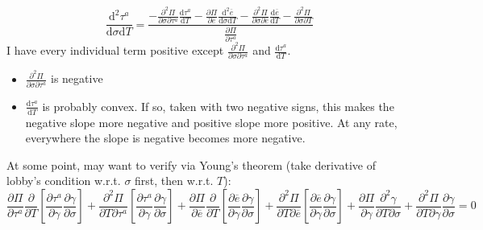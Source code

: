 \documentclass[12pt]{article}
\newcommand{\ov}{\overline}
\newcommand{\ga}{\gamma}
\begin{document}
\[
  \frac{\mathrm{d}^2 \tau^a}{\mathrm{d} \sigma \mathrm{d} T} = \frac{- \frac{\partial^2 \Pi}{\partial \sigma \partial \tau^a}\frac{\mathrm{d} \tau^a}{\mathrm{d} T} - \frac{\partial \Pi}{\partial \ov{e}} \frac{\mathrm{d}^2 \ov{e}}{\mathrm{d} \sigma \mathrm{d} T} - \frac{\partial^2 \Pi}{\partial \sigma \partial \ov{e}} \frac{\mathrm{d} \ov{e}}{\mathrm{d} T} - \frac{\partial^2 \Pi}{\partial \sigma \partial T}}{\frac{\partial \Pi}{\partial \tau^a}}
\]
I have every individual term positive except $\frac{\partial^2 \Pi}{\partial \sigma \partial \tau^a}$ and $\frac{\mathrm{d} \tau^a}{\mathrm{d} T}$.
\begin{itemize}
	\item $\frac{\partial^2 \Pi}{\partial \sigma \partial \tau^a}$ is negative
	\item $\frac{\mathrm{d} \tau^a}{\mathrm{d} T}$ is probably convex. If so, taken with two negative signs, this makes the negative slope more negative and positive slope more positive. At any rate, everywhere the slope is negative becomes more negative.
\end{itemize}


\newpage
At some point, may want to verify via Young's theorem (take derivative of lobby's condition w.r.t. $\sigma$ first, then w.r.t. $T$):
\[
  \frac{\partial \Pi}{\partial \tau^a} \frac{\partial}{\partial T} \left[\frac{\partial \tau^a}{\partial \ga }\frac{\partial \ga}{\partial \sigma }\right] + \frac{\partial^2 \Pi}{\partial T \partial \tau^a} \left[\frac{\partial \tau^a}{\partial \ga }\frac{\partial \ga}{\partial \sigma }\right] + \frac{\partial \Pi}{\partial \ov{e}} \frac{\partial}{\partial T} \left[\frac{\partial \ov{e}}{\partial \ga }\frac{\partial \ga}{\partial \sigma }\right]+ \frac{\partial^2 \Pi}{\partial T \partial \ov{e}} \left[\frac{\partial \ov{e}}{\partial \ga }\frac{\partial \ga}{\partial \sigma}\right] + \frac{\partial \Pi}{\partial \ga}\frac{\partial^2 \ga}{\partial T\partial \sigma} + \frac{\partial^2 \Pi}{\partial T \partial \ga}\frac{\partial \ga}{\partial \sigma} = 0
\]
\end{document}
